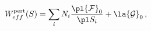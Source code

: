 \begin{equation}
W_{eff}^{{\rm pert}}(S) = \sum_i N_i \frac{\pl {\cal F}_0}{\pl S_i} + \la
{\cal G}_0 \, ,
\end{equation}

